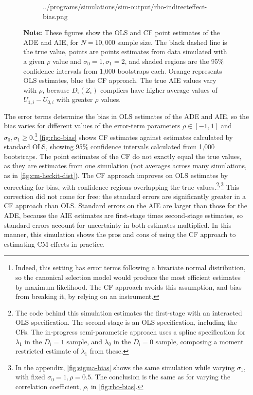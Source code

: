 \begin{figure}[h!]
\begin{subfigure}[c]{0.475\textwidth}
{            ../programs/simulations/sim-output/rho-indirecteffect-bias.png}
    \end{subfigure}
    \label{fig:rho-bias}
    \justify
    \footnotesize    
    \textbf{Note:}
    These figures show the OLS and CF point estimates of the ADE and AIE, for $N = 10,000$ sample size.
    The black dashed line is the true value, points are points estimates from data simulated with a given $\rho$ value and $\sigma_0 = 1, \sigma_1 = 2$, and shaded regions are the 95\% confidence intervals from 1,000 bootstraps each.
    Orange represents OLS estimates, blue the CF approach.
    The true AIE values vary with $\rho$, because $D_i(Z_i)$ compliers have higher average values of $U_{1,i} - U_{0,i}$ with greater $\rho$ values.
\end{figure}

The error terms determine the bias in OLS estimates of the ADE and AIE, so the bias varies for different values of the error-term parameters $\rho \in [-1, 1]$ and $\sigma_0, \sigma_1 \geq 0$.\footnote{
    Indeed, this setting has error terms following a bivariate normal distribution, so the canonical \cite{heckman1974shadow} selection model would produce the most efficient estimates by maximum likelihood.
    The CF approach avoids this assumption, and bias from breaking it, by relying on an instrument.
}
\autoref{fig:rho-bias} shows CF estimates against estimates calculated by standard OLS, showing 95\% confidence intervals calculated from 1,000 bootstraps.
The point estimates of the CF do not exactly equal the true values, as they are estimates from one simulation (not averages across many simulations, as in \autoref{fig:cm-heckit-dist}).
The CF approach improves on OLS estimates by correcting for bias, with confidence regions overlapping the true values.\footnote{
    The code behind this simulation estimates the first-stage with an interacted OLS specification.
    The second-stage is an OLS specification, including the CFs.
    The in-progress semi-parametric approach uses a spline specification for $\lambda_1$ in the $D_i = 1$ sample, and $\lambda_0$ in the $D_i = 0$ sample, composing a moment restricted estimate of $\lambda_1$ from these. 
}$^,$\footnote{
    In the appendix, \autoref{fig:sigma-bias} shows the same simulation while varying $\sigma_1$, with fixed $\sigma_0 = 1, \rho = 0.5$.
    The conclusion is the same as for varying the correlation coefficient, $\rho$, in \autoref{fig:rho-bias}.
}
This correction did not come for free: the standard errors are significantly greater in a CF approach than OLS.
Standard errors on the AIE are larger than those for the ADE, because the AIE estimates are first-stage times second-stage estimates, so standard errors account for uncertainty in both estimates multiplied.
In this manner, this simulation shows the pros and cons of using the CF approach to estimating CM effects in practice.
